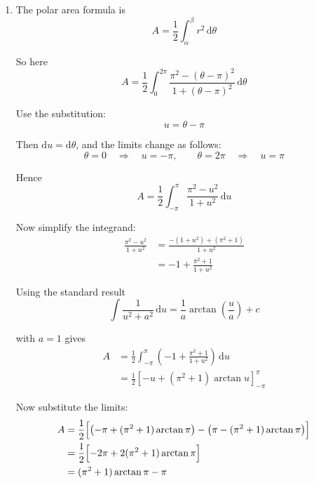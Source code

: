 \documentclass[leqno]{article}
\begin{document}
\begin{enumerate}[
	  label=\textbf{\arabic*.},
	  leftmargin=*,
	  topsep=0pt,
	  partopsep=0pt,
	  parsep=0pt
	]
\begin{djsSolution}
\begin{enumerate}[label=\textbf{(\alph*)}]
	  When \(\theta=0\) or \(\theta=2\pi\), \(r^2=\frac{\pi^2-\pi^2}{1+\pi^2}=0\), so \(C\) starts and ends at the pole. Since \(r\) depends only on \((\theta-\pi)^2\), \(r(2\pi-\theta)=r(\theta)\), so \(C\) is symmetric about the initial line.

	  The sketch shows the furthest point at \(\theta=\pi\). Substituting gives
	  \[
	  r^2=\pi^2,\qquad r=\pi
	  \]

	  So its polar coordinates are \((\pi,\pi)\).

	  \item The polar area formula is
	  \[
	  A=\frac12\int_{\alpha}^{\beta} r^2\,\mathrm{d}\theta
	  \]

	  So here
	  \[
	  A=\frac12\int_0^{2\pi}\frac{\pi^2-(\theta-\pi)^2}{1+(\theta-\pi)^2}\,\mathrm{d}\theta
	  \]
	
	  Use the substitution:
	  \[
	  u=\theta-\pi
	  \]

	  Then \(\mathrm{d}u=\mathrm{d}\theta\), and the limits change as follows:
	  \[
	  \theta=0\quad\Longrightarrow\quad u=-\pi, \qquad \theta=2\pi\quad\Longrightarrow\quad u=\pi
	  \]

	  Hence
	  \[
	  A=\frac12\int_{-\pi}^{\pi}\frac{\pi^2-u^2}{1+u^2}\,\mathrm{d}u
	  \]
	
	  Now simplify the integrand:
	  \begin{align*}
	  \frac{\pi^2-u^2}{1+u^2}
	  &=\frac{-(1+u^2)+(\pi^2+1)}{1+u^2} \\
	  &=-1+\frac{\pi^2+1}{1+u^2}
	  \end{align*}
	
	  Using the standard result
	  \[
	  \int \dfrac{1}{u^2+a^2}\,\mathrm{d}u=\dfrac{1}{a}\arctan\left(\dfrac{u}{a}\right)+c
	  \]

	  with \(a=1\) gives
	  \begin{align*}
	  A
	  &=\frac12\int_{-\pi}^{\pi}\left(-1+\frac{\pi^2+1}{1+u^2}\right)\,\mathrm{d}u \\
	  &=\frac12\left[-u+(\pi^2+1)\arctan u\right]_{-\pi}^{\pi}
	  \end{align*}
	
	  Now substitute the limits:
	  \begin{align*}
	  A
	  &=\frac12\Bigl[\bigl(-\pi+(\pi^2+1)\arctan\pi\bigr)-\bigl(\pi-(\pi^2+1)\arctan\pi\bigr)\Bigr] \\
	  &=\frac12\Bigl[-2\pi+2(\pi^2+1)\arctan\pi\Bigr] \\
	  &=(\pi^2+1)\arctan\pi-\pi
	  \end{align*}
	\end{enumerate}
	\end{djsSolution}
	
	
\end{enumerate}
\end{document}
